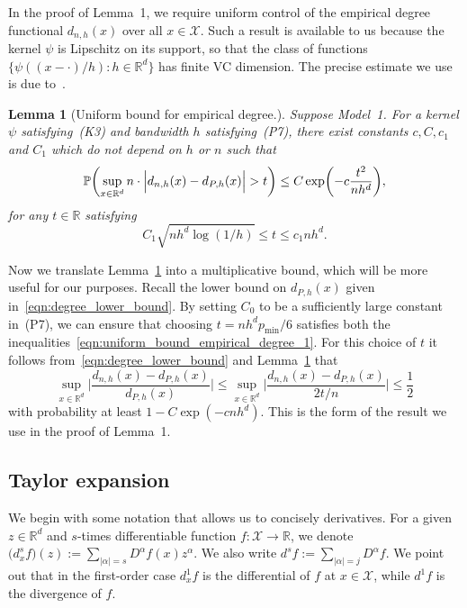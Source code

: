 \documentclass[aos]{imsart}
\theoremstyle{plain}
\newtheorem{lemma}{Lemma}
\theoremstyle{definition}
\theoremstyle{remark}
\def\R{\mathbb{R}}
\newcommand{\Pbb}{\mathbb{P}}
\newcommand{\mc}[1]{\mathcal{#1}}
\newcommand{\Reals}{\mathbb{R}} %
\newcommand{\Rd}{\Reals^d}
\newcommand{\1}{\mathbf{1}}
\begin{document}
In the proof of Lemma~1, we require uniform control of the empirical degree functional $d_{n,h}(x)$ over all $x \in \mc{X}$. Such a result is available to us because the kernel $\psi$ is Lipschitz on its support, so that the class of functions $\{\psi((x - \cdot)/h): h \in \Rd\}$ has finite VC dimension. The precise estimate we use is due to~\cite{gine2002}.
\begin{lemma}[Uniform bound for empirical degree.]
	\label{lem:uniform_bound_empirical_degree}
	Suppose Model~1. For a kernel $\psi$ satisfying~(K3) and bandwidth $h$ satisfying~(P7), there exist constants $c, C, c_1$ and $C_1$ which do not depend on $h$ or $n$ such that
	\begin{equation*}
	\Pbb\biggl(\sup_{x \in \Rd} n \cdot \Bigl|d_{n,h}(x) - d_{P,h}(x)\Bigr| > t\biggr) \leq C\exp\biggl(-c \frac{t^2}{nh^d}\biggr),
	\end{equation*}
	for any $t \in \Reals$ satisfying
	\begin{equation}
	\label{eqn:uniform_bound_empirical_degree_1}
	C_1\sqrt{nh^d \log(1/h)} \leq t \leq c_1 nh^d.
	\end{equation}
\end{lemma}
Now we translate Lemma~\ref{lem:uniform_bound_empirical_degree} into a multiplicative bound, which will be more useful for our purposes. 
Recall the lower bound on $d_{P,h}(x)$ given in~\eqref{eqn:degree_lower_bound}. By setting $C_0$ to be a sufficiently large constant in~(P7), we can ensure that choosing $t = n h^d p_{\min}/6$ satisfies both the inequalities~\eqref{eqn:uniform_bound_empirical_degree_1}. For this choice of $t$ it follows from~\eqref{eqn:degree_lower_bound} and Lemma~\ref{lem:uniform_bound_empirical_degree} that
\begin{equation}
\label{eqn:uniform_bound_empirical_degree_2}
\sup_{x \in \Rd} \biggl|\frac{d_{n,h}(x) - d_{P,h}(x)}{d_{P,h}(x)}\biggr| \leq \sup_{x \in \Rd} \biggl|\frac{d_{n,h}(x) - d_{P,h}(x)}{2t/n}\biggr| \leq \frac{1}{2}
\end{equation}
with probability at least $1 - C\exp(-cnh^d)$. This is the form of the result we use in the proof of Lemma~1.

\subsection{Taylor expansion}
\label{subsec:taylor_expansion}
We begin with some notation that allows us to concisely derivatives. For a given $z \in \Rd$ and $s$-times differentiable function $f: \mc{X} \to \Reals$, we denote $\bigl(d_x^sf\bigr)(z) := \sum_{|\alpha| = s} D^{\alpha}f(x) z^{\alpha}$. We also write $d^sf := \sum_{|\alpha| = j} D^{\alpha}f$. We point out that in the first-order case $d_x^1f$ is the differential of $f$ at $x \in \mc{X}$, while $d^1f$ is the divergence of $f$.
\end{document}
